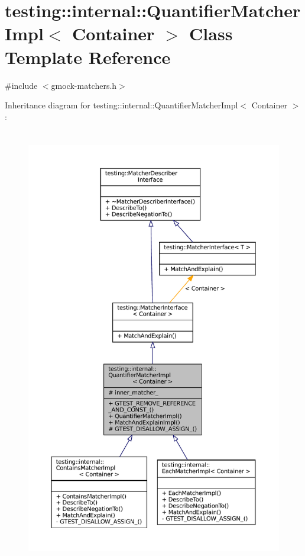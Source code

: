 \hypertarget{classtesting_1_1internal_1_1QuantifierMatcherImpl}{}\section{testing\+:\+:internal\+:\+:Quantifier\+Matcher\+Impl$<$ Container $>$ Class Template Reference}
\label{classtesting_1_1internal_1_1QuantifierMatcherImpl}


{\ttfamily \#include $<$gmock-\/matchers.\+h$>$}



Inheritance diagram for testing\+:\+:internal\+:\+:Quantifier\+Matcher\+Impl$<$ Container $>$\+:
\nopagebreak
\begin{figure}[H]
\begin{center}
\leavevmode
\includegraphics[height=550pt]{classtesting_1_1internal_1_1QuantifierMatcherImpl__inherit__graph}
\end{center}
\end{figure}


